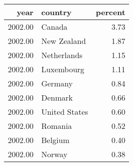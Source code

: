 \begin{table}[ht]
\centering
\begin{tabular}{rlr}
  \hline
year & country & percent \\ 
  \hline
2002.00 & Canada & 3.73 \\ 
  2002.00 & New Zealand & 1.87 \\ 
  2002.00 & Netherlands & 1.15 \\ 
  2002.00 & Luxembourg & 1.11 \\ 
  2002.00 & Germany & 0.84 \\ 
  2002.00 & Denmark & 0.66 \\ 
  2002.00 & United States & 0.60 \\ 
  2002.00 & Romania & 0.52 \\ 
  2002.00 & Belgium & 0.40 \\ 
  2002.00 & Norway & 0.38 \\ 
   \hline
\end{tabular}
\end{table}
